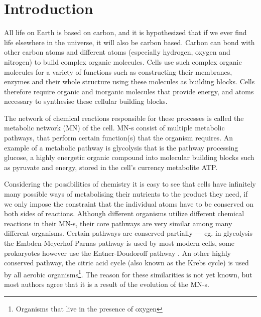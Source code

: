 \documentclass[a4paper,12pt]{article}
\begin{document}
	\newpage
	\section{Introduction}

	All life on Earth is based on carbon, and it is hypothesized that if we ever find life elsewhere in the universe, it will also be carbon based. %
	Carbon can bond with other carbon atoms and different atoms (especially hydrogen, oxygen and nitrogen) to build complex organic molecules. Cells use such complex organic molecules for a variety of functions such as constructing their membranes, enzymes and their whole structure using these molecules as building blocks. Cells therefore require organic and inorganic molecules that provide energy, and atoms necessary to synthesise these cellular building blocks.

	The network of chemical reactions responsible for these processes is called the metabolic network (MN) of the cell. MN-s consist of multiple metabolic pathways, that perform certain function(s) that the organism requires. An example of a metabolic pathway is glycolysis that is the pathway processing glucose, a highly energetic organic compound into molecular building blocks such as pyruvate and energy, stored in the cell's currency metabolite ATP.
	
	Considering the possibilities of chemistry it is easy to see that cells have  infinitely many possible ways of metabolising their nutrients to the product they need, if we only impose the constraint that the individual atoms have to be conserved on both sides of reactions. Although different organisms utilize different chemical reactions in their MN-s, their core pathways are very similar among many different organisms. Certain pathways are conserved partially ---  eg. in glycolysis the Embden-Meyerhof-Parnas  pathway \cite{EMPpathway} is used by most modern cells,  some prokaryotes however  use the Entner-Doudoroff pathway \cite{EDpathway}. An other highly conserved pathway, the citric acid cycle (also known as the Krebs cycle) is used by all aerobic organisms\footnote{Organisms that live in the presence of oxygen}.
	The reason for these similarities is not yet known, but most authors agree that it is a result of the evolution of the MN-s. 
\end{document}
